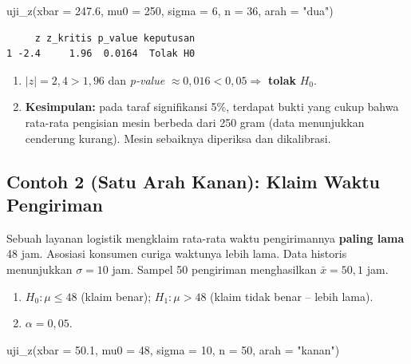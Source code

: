\documentclass[
  indonesian,
  letterpaper,
]{book}
\newenvironment{Shaded}{\begin{snugshade}}{\end{snugshade}}
\newcommand{\AttributeTok}[1]{\textcolor[rgb]{0.40,0.45,0.13}{#1}}
\newcommand{\DecValTok}[1]{\textcolor[rgb]{0.68,0.00,0.00}{#1}}
\newcommand{\FloatTok}[1]{\textcolor[rgb]{0.68,0.00,0.00}{#1}}
\newcommand{\FunctionTok}[1]{\textcolor[rgb]{0.28,0.35,0.67}{#1}}
\newcommand{\NormalTok}[1]{\textcolor[rgb]{0.00,0.23,0.31}{#1}}
\newcommand{\StringTok}[1]{\textcolor[rgb]{0.13,0.47,0.30}{#1}}
\providecommand{\tightlist}{%
  \setlength{\itemsep}{0pt}\setlength{\parskip}{0pt}}
\begin{document}
\begin{Shaded}
\begin{Highlighting}[]
\FunctionTok{uji\_z}\NormalTok{(}\AttributeTok{xbar =} \FloatTok{247.6}\NormalTok{, }\AttributeTok{mu0 =} \DecValTok{250}\NormalTok{, }\AttributeTok{sigma =} \DecValTok{6}\NormalTok{, }\AttributeTok{n =} \DecValTok{36}\NormalTok{, }\AttributeTok{arah =} \StringTok{"dua"}\NormalTok{)}
\end{Highlighting}
\end{Shaded}

\begin{verbatim}
     z z_kritis p_value keputusan
1 -2.4     1.96  0.0164  Tolak H0
\end{verbatim}

\begin{enumerate}
\def\labelenumi{\arabic{enumi}.}
\setcounter{enumi}{3}
\tightlist
\item
  \(|z| = 2{,}4 > 1{,}96\) dan \emph{p-value}
  \(\approx 0{,}016 < 0{,}05 \Rightarrow\) \textbf{tolak} \(H_0\).
\item
  \textbf{Kesimpulan:} pada taraf signifikansi 5\%, terdapat bukti yang
  cukup bahwa rata-rata pengisian mesin berbeda dari 250 gram (data
  menunjukkan cenderung kurang). Mesin sebaiknya diperiksa dan
  dikalibrasi.
\end{enumerate}

\subsection{Contoh 2 (Satu Arah Kanan): Klaim Waktu
Pengiriman}\label{contoh-2-satu-arah-kanan-klaim-waktu-pengiriman}

Sebuah layanan logistik mengklaim rata-rata waktu pengirimannya
\textbf{paling lama} 48 jam. Asosiasi konsumen curiga waktunya lebih
lama. Data historis menunjukkan \(\sigma = 10\) jam. Sampel 50
pengiriman menghasilkan \(\bar{x} = 50{,}1\) jam.

\begin{enumerate}
\def\labelenumi{\arabic{enumi}.}
\tightlist
\item
  \(H_0 : \mu \leq 48\) (klaim benar); \(H_1 : \mu > 48\) (klaim tidak
  benar -- lebih lama).
\item
  \(\alpha = 0{,}05\).
\end{enumerate}

\begin{Shaded}
\begin{Highlighting}[]
\FunctionTok{uji\_z}\NormalTok{(}\AttributeTok{xbar =} \FloatTok{50.1}\NormalTok{, }\AttributeTok{mu0 =} \DecValTok{48}\NormalTok{, }\AttributeTok{sigma =} \DecValTok{10}\NormalTok{, }\AttributeTok{n =} \DecValTok{50}\NormalTok{, }\AttributeTok{arah =} \StringTok{"kanan"}\NormalTok{)}
\end{Highlighting}
\end{Shaded}
\end{document}
